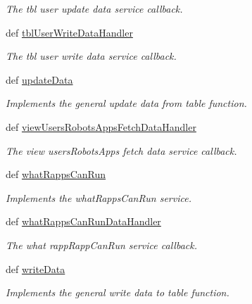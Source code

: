 \begin{DoxyCompactItemize}
\begin{DoxyCompactList}\small\item\em The tbl user update data service callback. \end{DoxyCompactList}\item 
def \hyperlink{classmysql__wrapper__old_1_1MySQLdbWrapper_a3dc34a21a6a0bd4fd16c4ccb6e1cebc8}{tbl\-User\-Write\-Data\-Handler}
\begin{DoxyCompactList}\small\item\em The tbl user write data service callback. \end{DoxyCompactList}\item 
def \hyperlink{classmysql__wrapper__old_1_1MySQLdbWrapper_a953db6dd3e5adf0de65735d6a7ddec03}{update\-Data}
\begin{DoxyCompactList}\small\item\em Implements the general update data from table function. \end{DoxyCompactList}\item 
def \hyperlink{classmysql__wrapper__old_1_1MySQLdbWrapper_a8a494978ae88cea820866310ba83c72d}{view\-Users\-Robots\-Apps\-Fetch\-Data\-Handler}
\begin{DoxyCompactList}\small\item\em The view users\-Robots\-Apps fetch data service callback. \end{DoxyCompactList}\item 
def \hyperlink{classmysql__wrapper__old_1_1MySQLdbWrapper_af5e6a95f96e34ca3b4132af822d09a3a}{what\-Rapps\-Can\-Run}
\begin{DoxyCompactList}\small\item\em Implements the what\-Rapps\-Can\-Run service. \end{DoxyCompactList}\item 
def \hyperlink{classmysql__wrapper__old_1_1MySQLdbWrapper_a7eac44dc3f233554a37223b34fbdd3cc}{what\-Rapps\-Can\-Run\-Data\-Handler}
\begin{DoxyCompactList}\small\item\em The what rapp\-Rapp\-Can\-Run service callback. \end{DoxyCompactList}\item 
def \hyperlink{classmysql__wrapper__old_1_1MySQLdbWrapper_a1aa729742fac743fab6750d13586d327}{write\-Data}
\begin{DoxyCompactList}\small\item\em Implements the general write data to table function. \end{DoxyCompactList}\end{DoxyCompactItemize}
